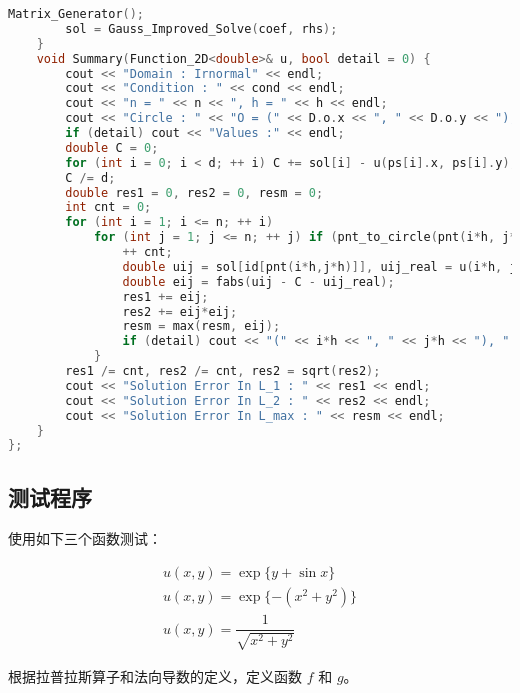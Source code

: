 \documentclass{ctexart}
\begin{document}
\begin{lstlisting}[language={c++}]
		Matrix_Generator();
		sol = Gauss_Improved_Solve(coef, rhs);
	}
	void Summary(Function_2D<double>& u, bool detail = 0) {
		cout << "Domain : Irnormal" << endl;
		cout << "Condition : " << cond << endl;
		cout << "n = " << n << ", h = " << h << endl;
		cout << "Circle : " << "O = (" << D.o.x << ", " << D.o.y << "), r = " << D.r << endl;
		if (detail) cout << "Values :" << endl;	
		double C = 0;
		for (int i = 0; i < d; ++ i) C += sol[i] - u(ps[i].x, ps[i].y);
		C /= d;
		double res1 = 0, res2 = 0, resm = 0;
		int cnt = 0;
		for (int i = 1; i <= n; ++ i)
			for (int j = 1; j <= n; ++ j) if (pnt_to_circle(pnt(i*h, j*h), D) > 0) {
				++ cnt;
				double uij = sol[id[pnt(i*h,j*h)]], uij_real = u(i*h, j*h);
				double eij = fabs(uij - C - uij_real);
				res1 += eij;
				res2 += eij*eij;
				resm = max(resm, eij);
				if (detail) cout << "(" << i*h << ", " << j*h << "), " << "Solution Value : " << uij << ", Real Value : " << uij_real << endl;
			}
		res1 /= cnt, res2 /= cnt, res2 = sqrt(res2);
		cout << "Solution Error In L_1 : " << res1 << endl;
		cout << "Solution Error In L_2 : " << res2 << endl;
		cout << "Solution Error In L_max : " << resm << endl;
	}
};
\end{lstlisting}

\subsection{测试程序}

使用如下三个函数测试：

\begin{align}
    u(x,y) = \exp\{y+\sin x\}\\
    u(x,y) = \exp\{-(x^2+y^2)\}\\
    u(x,y) = \dfrac 1{\sqrt{x^2+y^2}}
\end{align}

根据拉普拉斯算子和法向导数的定义，定义函数 $f$ 和 $g$。
\end{document}
